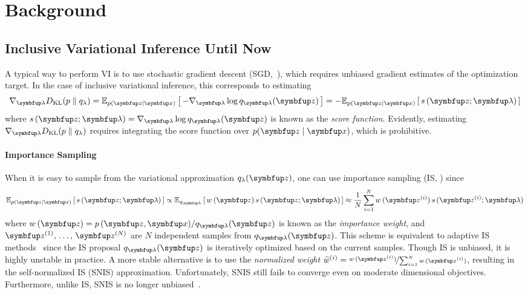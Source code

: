 
\section{Background}
\vspace{-0.05in}
\subsection{Inclusive Variational Inference Until Now}\label{section:ivi_previous}
\vspace{-0.05in}
A typical way to perform VI is to use stochastic gradient descent (SGD,~\citealt{robbins_stochastic_1951, bottou_online_1999}), which requires unbiased gradient estimates of the optimization target.
In the case of inclusive variational inference, this corresponds to estimating
%
\begin{align}
  \nabla_{\vlambda} \DKL{p}{q_{\lambda}}
  = \Esub{p(\vz\mid\vx)}{ - \nabla_{\vlambda} \log q_{\vlambda}(\vz) }
  = - \Esub{p(\vz\mid\vx)}{ s\,(\vz; \vlambda) }
\end{align}
where \(s\,(\vz; \vlambda) = \nabla_{\vlambda} \log q_{\vlambda}(\vz)\) is known as the \textit{score function}.
Evidently, estimating \(\nabla_{\vlambda} \DKL{p}{q_{\lambda}}\) requires integrating the score function over \(p(\vz\mid\vx)\), which is prohibitive.

\vspace{-0.1in}
\paragraph{Importance Sampling}
When it is easy to sample from the variational approximation \(q_{\lambda}(\vz)\), one can use importance sampling (IS, \citealt{robert_monte_2004, mcbook}) since 
\begin{align}
  \Esub{p(\vz\mid\vx)}{ s\,(\vz; \vlambda) }
  \propto \Esub{q_{\vlambda}}{ w\,(\vz) \, s\,(\vz; \vlambda) }
  \approx \frac{1}{N} \sum^{N}_{i=1} w\,(\vz^{(i)}) \, s\,(\vz^{(i)}; \vlambda)
\end{align}
where \(w\,(\vz) = p\,(\vz,\vx) / q_{\vlambda}(\vz)\) is known as the \textit{importance weight}, and \(\vz^{(1)},\, \ldots,\, \vz^{(N)}\) are \(N\) independent samples from \(q_{\vlambda}(\vz)\).
This scheme is equivalent to adaptive IS methods~\citep{cappe_adaptive_2008, bugallo_adaptive_2017} since the IS proposal \(q_{\vlambda}(\vz)\) is iteratively optimized based on the current samples.
Though IS is unbiased, it is highly unstable in practice.
A more stable alternative is to use the \textit{normalized weight} \(\widetilde{w}^{(i)} = \nicefrac{w\,(\vz^{(i)})}{\sum_{i=1}^N w\,(\vz^{(i)}) }\), resulting in the self-normalized IS (SNIS) approximation.
Unfortunately, SNIS still fails to converge even on moderate dimensional objectives.
Furthermore, unlike IS, SNIS is no longer unbiased~\citep{robert_monte_2004, mcbook}.

